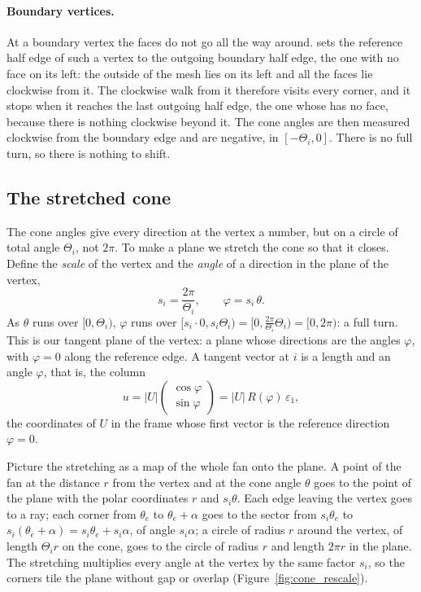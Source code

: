 \paragraph{Boundary vertices.} At a boundary vertex the faces do not go all the way around.  sets the reference half edge  of such a vertex to the outgoing boundary half edge, the one with no face on its left: the outside of the mesh lies on its left and all the faces lie clockwise from it. The clockwise walk from it therefore visits every corner, and it stops when it reaches the last outgoing half edge, the one whose  has no face, because there is nothing clockwise beyond it. The cone angles are then measured clockwise from the boundary edge and are negative, in $[-\Theta_i, 0]$. There is no full turn, so there is nothing to shift.

\subsection{The stretched cone}

The cone angles give every direction at the vertex a number, but on a circle of total angle $\Theta_i$, not $2\pi$. To make a plane we stretch the cone so that it closes. Define the \emph{scale} of the vertex and the \emph{angle} of a direction in the plane of the vertex,
\begin{equation}
\label{eqn:scale}
s_i = \frac{2\pi}{\Theta_i}, \qquad \varphi = s_i\, \theta .
\end{equation}
As $\theta$ runs over $[0, \Theta_i)$, $\varphi$ runs over $[s_i\cdot 0, s_i\Theta_i) = [0, \frac{2\pi}{\Theta_i}\Theta_i) = [0, 2\pi)$: a full turn. This is our tangent plane of the vertex: a plane whose directions are the angles $\varphi$, with $\varphi = 0$ along the reference edge. A tangent vector at $i$ is a length and an angle $\varphi$, that is, the column
\begin{equation*}
u = |U|\begin{pmatrix} \cos\varphi \\ \sin\varphi \end{pmatrix} = |U|\, R(\varphi)\,\varepsilon_1 ,
\end{equation*}
the coordinates of $U$ in the frame whose first vector is the reference direction $\varphi = 0$.

Picture the stretching as a map of the whole fan onto the plane. A point of the fan at the distance $r$ from the vertex and at the cone angle $\theta$ goes to the point of the plane with the polar coordinates $r$ and $s_i\theta$. Each edge leaving the vertex goes to a ray; each corner from $\theta_e$ to $\theta_e + \alpha$ goes to the sector from $s_i\theta_e$ to $s_i(\theta_e + \alpha) = s_i\theta_e + s_i\alpha$, of angle $s_i\alpha$; a circle of radius $r$ around the vertex, of length $\Theta_i r$ on the cone, goes to the circle of radius $r$ and length $2\pi r$ in the plane. The stretching multiplies every angle at the vertex by the same factor $s_i$, so the corners tile the plane without gap or overlap (Figure~\ref{fig:cone_rescale}).

